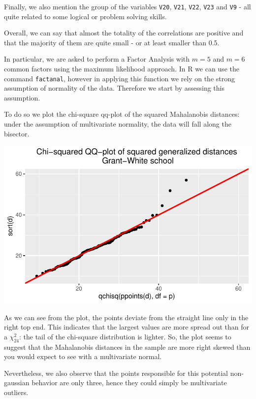 \documentclass[
  letterpaper,
  DIV=11,
  numbers=noendperiod]{scrartcl}
\begin{document}
Finally, we also mention the group of the variables \texttt{V20},
\texttt{V21}, \texttt{V22}, \texttt{V23} and \texttt{V9} - all quite
related to some logical or problem solving skills.

Overall, we can say that almost the totality of the correlations are
positive and that the majority of them are quite small - or at least
smaller than 0.5.

In particular, we are asked to perform a Factor Analysis with \(m=5\)
and \(m=6\) common factors using the maximum likelihood approach. In R
we can use the command \texttt{factanal}, however in applying this
function we rely on the strong assumption of normality of the data.
Therefore we start by assessing this assumption.

To do so we plot the chi-square qq-plot of the squared Mahalanobis
distances: under the assumption of multivariate normality, the data will
fall along the bisector.

\includegraphics{ProblemSet2_files/figure-pdf/unnamed-chunk-9-1.pdf}

As we can see from the plot, the points deviate from the straight line
only in the right top end. This indicates that the largest values are
more spread out than for a \(\chi_{24}^2\): the tail of the chi-square
distribution is lighter. So, the plot seems to suggest that the
Mahalanobis distances in the sample are more right skewed than you would
expect to see with a multivariate normal.

Nevertheless, we also observe that the points responsible for this
potential non-gaussian behavior are only three, hence they could simply
be multivariate outliers.
\end{document}
